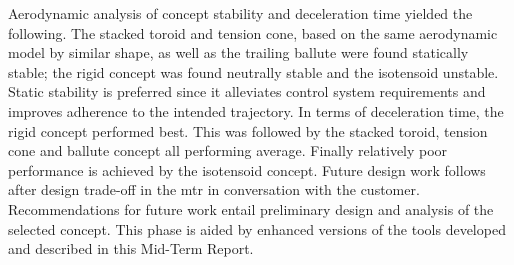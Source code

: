 \newline
\newline
Aerodynamic analysis of concept stability and deceleration time yielded the following. The stacked toroid and tension cone, based on the same aerodynamic model by similar shape, as well as the trailing ballute were found statically stable; the rigid concept was found neutrally stable and the isotensoid unstable. Static stability is preferred since it alleviates control system requirements and improves adherence to the intended trajectory. In terms of deceleration time, the rigid concept performed best. This was followed by the stacked toroid, tension cone and ballute concept all performing average. Finally relatively poor performance is achieved by the isotensoid concept.
\newline
\newline
Future design work follows after design trade-off in the \acrfull{mtr} in conversation with the customer. Recommendations for future work entail preliminary design and analysis of the selected concept. This phase is aided by enhanced versions of the tools developed and described in this Mid-Term Report.



